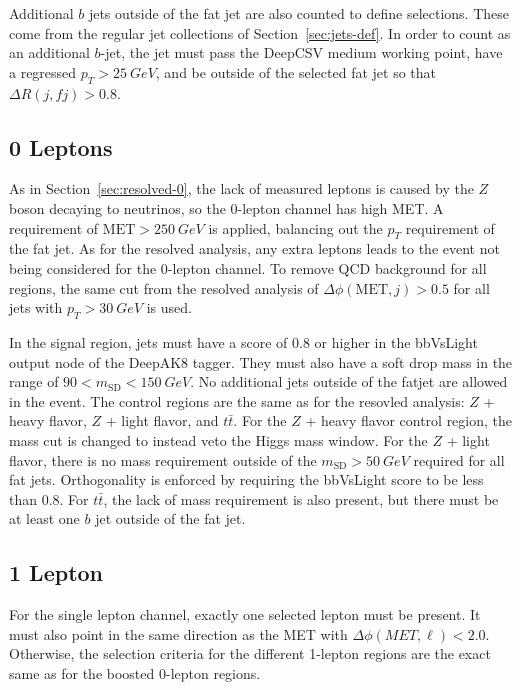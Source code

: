 Additional $b$ jets outside of the fat jet are also counted to define selections.
These come from the regular jet collections of Section~\ref{sec:jets-def}.
In order to count as an additional $b$-jet,
the jet must pass the DeepCSV medium working point,
have a regressed $p_T > \SI{25}{GeV}$, and be outside of the selected fat jet
so that $\Delta R(j, fj) > 0.8$.

\subsection{0 Leptons}

As in Section~\ref{sec:resolved-0}, the lack of measured leptons is caused by
the $Z$ boson decaying to neutrinos, so the 0-lepton channel has high MET.
A requirement of $\mathrm{MET} > \SI{250}{GeV}$ is applied,
balancing out the $p_T$ requirement of the fat jet.
As for the resolved analysis, any extra leptons leads to the event not being considered
for the 0-lepton channel.
To remove QCD background for all regions, the same cut from the resolved analysis of
$\Delta \phi(\mathrm{MET}, j) > 0.5$ for all jets with $p_T > \SI{30}{GeV}$ is used.

In the signal region, jets must have a score of 0.8 or higher in the
bbVsLight output node of the DeepAK8 tagger.
They must also have a soft drop mass in the range of $90 < m_\mathrm{SD} < \SI{150}{GeV}$.
No additional jets outside of the fatjet are allowed in the event.
The control regions are the same as for the resovled analysis:
$Z$ + heavy flavor, $Z$ + light flavor, and $t\bar{t}$.
For the $Z$ + heavy flavor control region,
the mass cut is changed to instead veto the Higgs mass window.
For the $Z$ + light flavor, there is no mass requirement outside of the
$m_\textrm{SD} > \SI{50}{GeV}$ required for all fat jets.
Orthogonality is enforced by requiring the bbVsLight score to be less than 0.8.
For $t\bar{t}$, the lack of mass requirement is also present,
but there must be at least one $b$ jet outside of the fat jet.

\subsection{1 Lepton}

For the single lepton channel, exactly one selected lepton must be present.
It must also point in the same direction as the MET with $\Delta \phi(MET, \ell) < 2.0$.
Otherwise, the selection criteria for the different 1-lepton regions
are the exact same as for the boosted 0-lepton regions.

